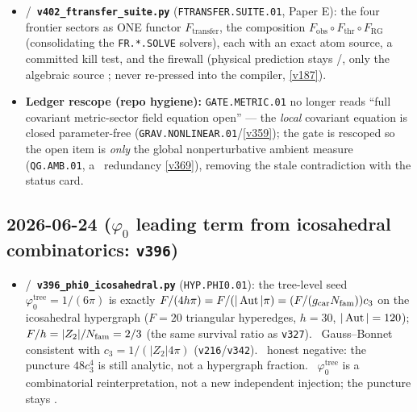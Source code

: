 \begin{itemize}
\item \mE/\mC\ \textbf{\texttt{v402\_ftransfer\_suite.py}} (\texttt{FTRANSFER.SUITE.01}, Paper E): the four frontier sectors as ONE functor $F_{\mathrm{transfer}}$, the composition $F_{\mathrm{obs}}\circ F_{\mathrm{thr}}\circ F_{\mathrm{RG}}$ (consolidating the \texttt{FR.*.SOLVE} solvers), each with an exact atom source, a committed kill test, and the firewall (physical prediction stays \mC/\mO, only the algebraic source \mE; never re-pressed into the compiler, \vref{v187}).
\item \textbf{Ledger rescope (repo hygiene):} \texttt{GATE.METRIC.01} no longer reads ``full covariant metric-sector field equation open'' --- the \emph{local} covariant equation is closed parameter-free (\texttt{GRAV.NONLINEAR.01}/\vref{v359}); the gate is rescoped so the open item is \emph{only} the global nonperturbative ambient measure (\texttt{QG.AMB.01}, a \mC\ redundancy \vref{v369}), removing the stale contradiction with the status card.
\end{itemize}

\subsection*{2026-06-24 ($\varphi_0$ leading term from icosahedral combinatorics: \texttt{v396})}
\begin{itemize}
  \item \mE/\mC\ \textbf{\texttt{v396\_phi0\_icosahedral.py}} (\texttt{HYP.PHI0.01}): the tree-level seed $\varphi_0^{\mathrm{tree}}=1/(6\pi)$ is exactly $F/(4h\pi)=F/(|\operatorname{Aut}|\pi)=(F/(g_{\mathrm{car}}N_{\mathrm{fam}}))c_3$ on the icosahedral hypergraph ($F=20$ triangular hyperedges, $h=30$, $|\operatorname{Aut}|=120$); $F/h=|Z_2|/N_{\mathrm{fam}}=2/3$ (the same survival ratio as \texttt{v327}). \mE\ Gauss--Bonnet consistent with $c_3=1/(|Z_2|4\pi)$ (\texttt{v216}/\texttt{v342}). \mE\ honest negative: the puncture $48c_3^4$ is still analytic, not a hypergraph fraction. \mC\ $\varphi_0^{\mathrm{tree}}$ is a combinatorial reinterpretation, not a new independent injection; the puncture stays \mO.
\end{itemize}

